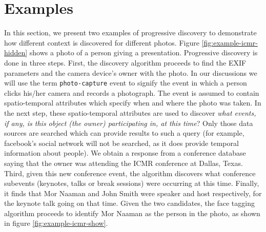 \section{Examples}
In this section, we present two examples of progressive discovery to demonstrate how different context is discovered for different photos. Figure \ref{fig:example-icmr-hidden} shows a photo of a person giving a presentation. Progressive discovery is done in three steps. First, the discovery algorithm proceeds to find the EXIF parameters and the camera device's owner with the photo. In our discussions we will use the term \texttt{photo-capture} event to signify the event in which a person clicks his/her camera and records a photograph. The event is assumed to contain spatio-temporal attributes which specify when and where the photo was taken. In the next step, these spatio-temporal attributes are used to discover \textit{what events, if any, is this object (the owner) participating in, at this time}? Only those data sources are searched which can provide results to such a query (for example, facebook's social network will not be searched, as it does provide temporal information about people). We obtain a response from a conference database saying that the owner was attending the ICMR conference at Dallas, Texas. Third, given this new conference event, the algorithm discovers what conference subevents (keynotes, talks or break sessions) were occurring at this time. Finally, it finds that Mor Naaman and John Smith were speaker and host respectively, for the keynote talk going on that time. Given the two candidates, the face tagging algorithm proceeds to identify Mor Naaman as the person in the photo, as shown in figure \ref{fig:example-icmr-show}.


